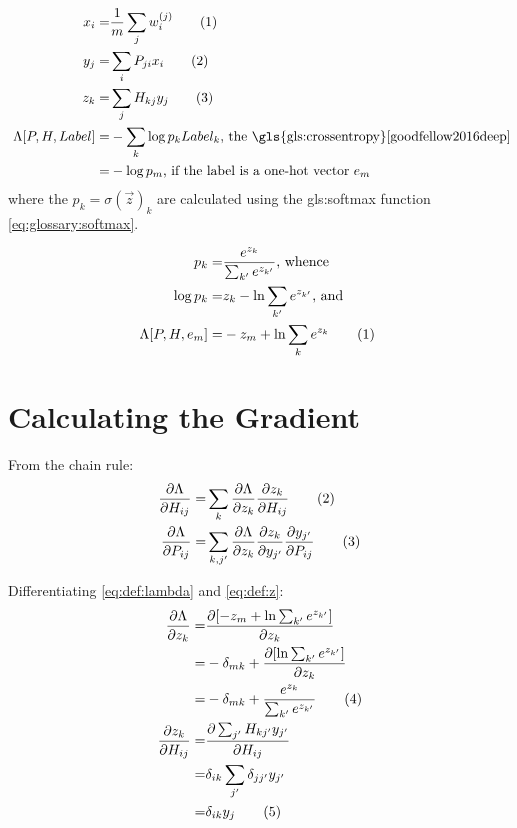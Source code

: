 \documentclass[]{article}
\newcommand\numberthis{\addtocounter{equation}{1}\tag{\theequation}}
\begin{document}
\begin{align*}
	x_i =& \frac{1} {m} \sum_j w_i^{(j)} \numberthis \label{eq:def:x}\\
	y_j =& \sum_i P_{ji} x_i  \numberthis \label{eq:def:y}\\
	z_k =& \sum_j H_{kj} y_j \numberthis \label{eq:def:z}\\\
	\Lambda[P,H,Label] =& -\sum_k  \log {p_k} Label_k \text {, the \gls{gls:crossentropy}\cite{goodfellow2016deep}}\\
	=& -\log {p_m} \text{, if the label is a one-hot vector $e_m$}
\end{align*}
where the $p_k=\sigma(\vec{z})_k$ are calculated using the \gls{gls:softmax} function \eqref{eq:glossary:softmax}.

\begin{align*}
	p_k =& \frac{e^{z_k}}{\sum_{k^{\prime}} e^{z_{k^{\prime}}}} \text{, whence}\\
	\log{p_k} =& z_k - \ln \sum_{k^{\prime}} e^{z_{k^{\prime}}} \text{, and}\\
	\Lambda[P,H,e_m] =& -z_m +  \ln \sum_{k} e^{z_{k}}  \numberthis \label{eq:def:lambda}\
\end{align*}

\section{Calculating the Gradient}

From the chain rule:
\begin{align*}
	\frac{\partial{\Lambda}}{\partial H_{ij}} =& \sum_k \frac{\partial{\Lambda}}{\partial z_k}\frac{\partial z_k}{\partial H_{ij}} \numberthis \label{eq:Lambda:H}\\
	\frac{\partial{\Lambda}}{\partial P_{ij}} =&\sum_{k,j^{\prime}} \frac{\partial{\Lambda}}{\partial z_k} \frac{\partial z_k}{\partial y_{j^{\prime}}} \frac{\partial y_{j^{\prime}}}{\partial P_{ij}} \numberthis \label{eq:Lambda:P}
\end{align*}

Differentiating \eqref{eq:def:lambda} and \eqref{eq:def:z}:
\begin{align*}
	\frac{\partial \Lambda}{\partial z_k} =& \frac{\partial [-z_m +  \ln \sum_{k^{\prime}} e^{z_{k^{\prime}}}]}{\partial z_k}\\
	=& - \delta_{mk} + \frac{\partial [\ln \sum_{k^{\prime}} e^{z_{k^{\prime}}}]}{\partial z_k}\\
	=& - \delta_{mk} + \frac{e^{z_k}}{\sum_{k^{\prime}} e^{z_{k^{\prime}}}} \numberthis \label{eq:Lambda:z}\\
	\frac{\partial z_k}{\partial H_{ij}} =& \frac{ \partial \sum_{j^{\prime}} H_{k{j^{\prime}}} y_{j^{\prime}}}{\partial H_{ij}}\\
	=& \delta_{ik} \sum_{j^{\prime}} \delta_{j{j^{\prime}}} y_{j^{\prime}}\\
	=& \delta_{ik} y_j \numberthis \label{eq:z:H}\\
\end{align*}
\end{document}
